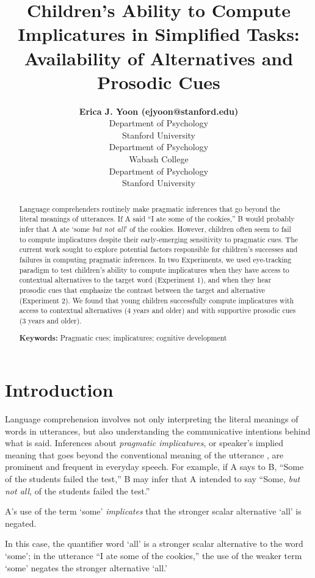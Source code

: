 \documentclass[10pt,letterpaper]{article}
\title{Children's Ability to Compute Implicatures in Simplified Tasks: \linebreak Availability of Alternatives and Prosodic Cues}
\author{{\large \bf Erica J. Yoon (ejyoon@stanford.edu)} \\
  Department of Psychology \\
  Stanford University
  \AND {\large \bf Charles Y. Wu (ywu15@wabash.edu)} \\
  Department of Psychology \\
  Wabash College
  \AND {\large \bf Michael C. Frank (mcfrank@stanford.edu)} \\
  Department of Psychology \\
  Stanford University}
\begin{document}
\maketitle


\begin{abstract}
Language comprehenders routinely make pragmatic inferences that go beyond the literal meanings of utterances. If A said ``I ate some of the cookies,'' B would probably infer that A ate `some \emph{but not all}' of the cookies. However, children often seem to fail to compute implicatures despite their early-emerging sensitivity to pragmatic cues. The current work sought to explore potential factors responsible for children's successes and failures in computing pragmatic inferences. In two Experiments, we used eye-tracking paradigm to test children's ability to compute implicatures when they have access to contextual alternatives to the target word (Experiment 1), and when they hear prosodic cues that emphasize the contrast between the target and alternative (Experiment 2). We found that young children successfully compute implicatures with access to contextual alternatives (4 years and older) and with supportive prosodic cues (3 years and older). 

\textbf{Keywords:} 
Pragmatic cues; implicatures; cognitive development

\end{abstract}


\section{Introduction}

Language comprehension involves not only interpreting the literal meanings of words in utterances, but also understanding the communicative intentions behind what is said. Inferences about \emph{pragmatic implicatures}, or speaker's implied meaning that goes beyond the conventional meaning of the utterance \cite{grice1975logic}, are prominent and frequent in everyday speech. For example, if A says to B, ``Some of the students failed the test,'' B may infer that A intended to say ``Some, \emph{but not all}, of the students failed the test.'' 

A's use of the term `some' \emph{implicates} that the stronger scalar alternative `all' is negated. 

In this case, the quantifier word `all' is a stronger scalar alternative to the word `some'; in the utterance ``I ate some of the cookies,'' the use of the weaker term `some' negates the stronger alternative `all.' 
\end{document}
